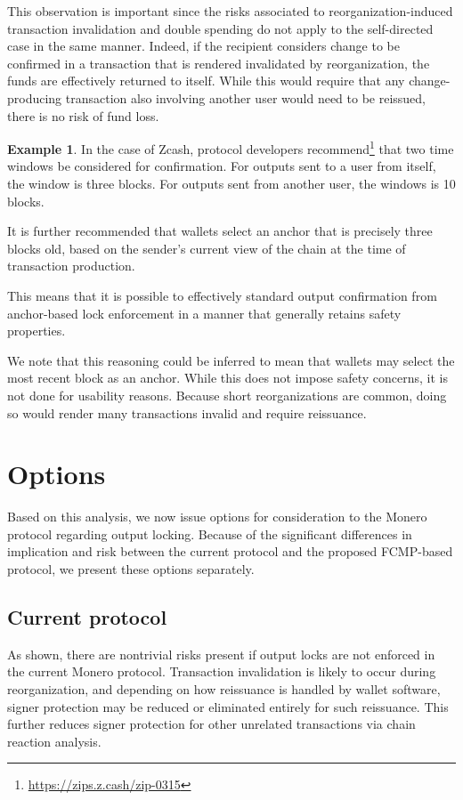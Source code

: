\documentclass{article}
\theoremstyle{definition}
\newtheorem*{example}{Example}
\begin{document}
This observation is important since the risks associated to reorganization-induced transaction invalidation and double spending do not apply to the self-directed case in the same manner.
Indeed, if the recipient considers change to be confirmed in a transaction that is rendered invalidated by reorganization, the funds are effectively returned to itself.
While this would require that any change-producing transaction also involving another user would need to be reissued, there is no risk of fund loss.

\begin{example}
In the case of Zcash, protocol developers recommend\footnote{\url{https://zips.z.cash/zip-0315}} that two time windows be considered for confirmation.
For outputs sent to a user from itself, the window is three blocks.
For outputs sent from another user, the windows is 10 blocks.

It is further recommended that wallets select an anchor that is precisely three blocks old, based on the sender's current view of the chain at the time of transaction production.
\end{example}

This means that it is possible to effectively standard output confirmation from anchor-based lock enforcement in a manner that generally retains safety properties.

We note that this reasoning could be inferred to mean that wallets may select the most recent block as an anchor.
While this does not impose safety concerns, it is not done for usability reasons.
Because short reorganizations are common, doing so would render many transactions invalid and require reissuance.


\section{Options}

Based on this analysis, we now issue options for consideration to the Monero protocol regarding output locking.
Because of the significant differences in implication and risk between the current protocol and the proposed FCMP-based protocol, we present these options separately.


\subsection{Current protocol}

As shown, there are nontrivial risks present if output locks are not enforced in the current Monero protocol.
Transaction invalidation is likely to occur during reorganization, and depending on how reissuance is handled by wallet software, signer protection may be reduced or eliminated entirely for such reissuance.
This further reduces signer protection for other unrelated transactions via chain reaction analysis.
\end{document}
